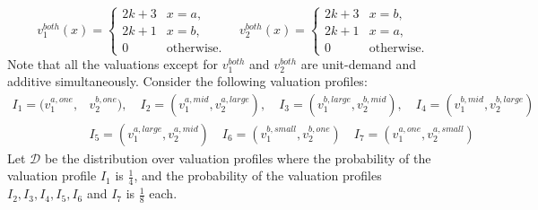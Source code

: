 \[
v_1^{{both}}(x) = 
\begin{cases}
2k+3 & x=a,\\
2k+1 & x=b,\\
0 & \text{otherwise.}
\end{cases} \quad 
v_2^{{both}}(x) = 
\begin{cases}
2k+3 & x=b,\\
2k+1 & x=a,\\
0 & \text{otherwise.}
\end{cases}
\]
Note that all the valuations except for $v_1^{both}$ and $v_2^{both}$ are unit-demand and additive simultaneously. 
Consider the following valuation profiles: 
\begin{align*}
 I_1 = (v_1^{{a,one}},& v_2^{{b,one}}), \quad  I_2 = (v_1^{a,mid}, v_2^{{a,large}}),  \quad I_3 = (v_1^{b,large}, v_2^{b,mid}), \quad
 I_4 = (v_1^{b,mid}, v_2^{b,large}) \\ & I_5 = (v_1^{a,large}, v_2^{a,mid}) \quad I_6 = (v_1^{b,small}, v_2^{b,one}) \quad I_7 =(v_1^{a,one}, v_2^{a,small}) 
\end{align*}
Let $\mathcal D$ be the distribution over valuation profiles where the probability of the valuation profile $I_1$ is $\frac{1}{4}$, and the probability of the valuation profiles $I_2,I_3,I_4,I_5,I_6$ and $I_7$ is $\frac{1}{8}$ each. 

